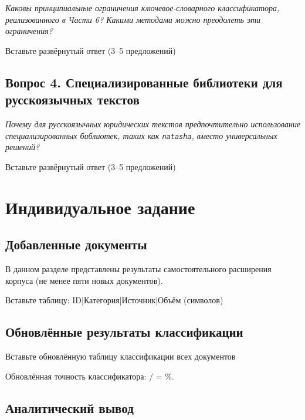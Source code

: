 \documentclass[12pt, a4paper]{report}
\newcommand{\placeholder}[2][Вставьте результат]{%
  \begin{tcolorbox}[placeholderbox, title={#2}]
    #1
  \end{tcolorbox}%
  \vspace{4pt}%
}
\begin{document}
\textit{Каковы принципиальные ограничения ключевое-словарного классификатора,
реализованного в Части 6? Какими методами можно преодолеть эти ограничения?}

\placeholder[Вставьте развёрнутый ответ (3–5 предложений)]{Ответ на вопрос 3}

\section{Вопрос 4. Специализированные библиотеки для русскоязычных текстов}

\textit{Почему для русскоязычных юридических текстов предпочтительно использование
специализированных библиотек, таких как \texttt{natasha}, вместо универсальных
решений?}

\placeholder[Вставьте развёрнутый ответ (3–5 предложений)]{Ответ на вопрос 4}

\chapter{Индивидуальное задание}

\section{Добавленные документы}

В данном разделе представлены результаты самостоятельного расширения корпуса
(не менее пяти новых документов).

\placeholder[Вставьте таблицу: ID\;|\;Категория\;|\;Источник\;|\;Объём (символов)]{Таблица добавленных документов}

\section{Обновлённые результаты классификации}

\placeholder[Вставьте обновлённую таблицу классификации всех документов]{Результаты классификации расширенного корпуса}

Обновлённая точность классификатора: \underline{\hspace{1.5cm}} /
\underline{\hspace{1cm}} = \underline{\hspace{1.5cm}}\%.

\section{Аналитический вывод}
\end{document}
